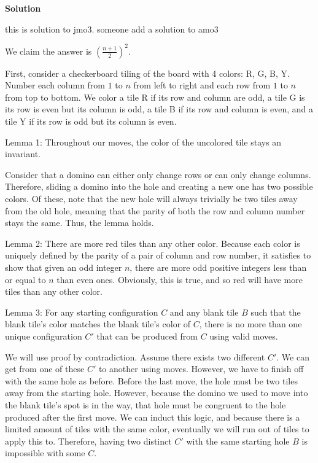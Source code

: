 \begin{enumerate}
 



\textbf{Solution}

this is solution to jmo3. someone add a solution to amo3

 


 We claim the answer is $(\frac{n+1}{2})^2$. 

 First, consider a checkerboard tiling of the board with 4 colors: R, G, B, Y. Number each column from $1$ to $n$ from left to right and each row from $1$ to $n$ from top to bottom. We color a tile R if its row and column are odd, a tile G is its row is even but its column is odd, a tile B if its row and column is even, and a tile Y if its row is odd but its column is even. 

 Lemma 1: Throughout our moves, the color of the uncolored tile stays an invariant. 

 Consider that a domino can either only change rows or can only change columns. Therefore, sliding a domino into the hole and creating a new one has two possible colors. Of these, note that the new hole will always trivially be two tiles away from the old hole, meaning that the parity of both the row and column number stays the same. Thus, the lemma holds.

 Lemma 2: There are more red tiles than any other color. Because each color is uniquely defined by the parity of a pair of column and row number, it satisfies to show that given an odd integer $n$, there are more odd positive integers less than or equal to $n$ than even ones. Obviously, this is true, and so red will have more tiles than any other color.

 Lemma 3: For any starting configuration $C$ and any blank tile $B$ such that the blank tile's color matches the blank tile's color of $C$, there is no more than one unique configuration $C'$ that can be produced from $C$ using valid moves. 

 We will use proof by contradiction. Assume there exists two different $C'$. We can get from one of these $C'$ to another using moves. However, we have to finish off with the same hole as before. Before the last move, the hole must be two tiles away from the starting hole. However, because the domino we used to move into the blank tile's spot is in the way, that hole must be congruent to the hole produced after the first move. We can induct this logic, and because there is a limited amount of tiles with the same color, eventually we will run out of tiles to apply this to. Therefore, having two distinct $C'$ with the same starting hole $B$ is impossible with some $C$.  


\end{enumerate}
